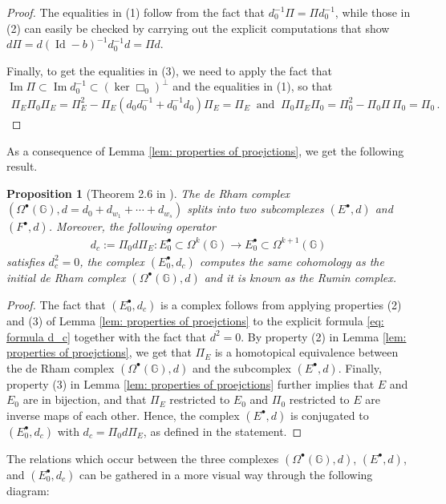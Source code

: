 \documentclass[dvipsnames]{amsart}
\newtheorem{proposition}[theorem]{Proposition}
\theoremstyle{definition}
\theoremstyle{definition}
\numberwithin{equation}{section}
\newcommand{\G}{\mathbb{G}}
\begin{document}
\begin{proof}
    The equalities in (1) follow from the fact that $d_0^{-1}\Pi=\Pi d_0^{-1}$, while those in (2) can easily be checked by carrying out the explicit computations that show $d\Pi=d(\operatorname{Id}-b)^{-1}d_0^{-1}d=\Pi d$.

    Finally, to get the equalities in (3), we need to apply the fact that $\operatorname{Im}\Pi\subset\operatorname{Im}d_0^{-1}\subset\left(\ker\Box_0\right)^\perp$ and the equalities in (1), so that
    \begin{align*}
        \Pi_E\Pi_0\Pi_E=\Pi_E^2-\Pi_E\left(d_0d_0^{-1}+d_0^{-1}d_0\right)\Pi_E=\Pi_E\ \text{ and }\ \Pi_0\Pi_E\Pi_0=\Pi_0^2-\Pi_0\Pi\,\Pi_0=\Pi_0\,.
    \end{align*}
\end{proof}
As a consequence of Lemma \ref{lem: properties of proejctions}, we get the following result.
\begin{proposition}[Theorem 2.6 in \cite{rumin_grenoble}]\label{prop: Rumin computing de RHam} The de Rham complex $(\Omega^\bullet(\G),d=d_0+d_{w_1}+\cdots+d_{w_s})$ splits into two subcomplexes $(E^\bullet,d)$ and $(F^\bullet,d)$. Moreover, the following operator
\begin{align}\label{eq: formula d_c}
    d_c:=\Pi_0d\Pi_E\colon E_0^\bullet\subset\Omega^k(\G)\longrightarrow E_0^\bullet\subset\Omega^{k+1}(\G)
\end{align}
    satisfies $d_c^2=0$, the complex $(E_0^\bullet,d_c)$ computes the same cohomology as the initial de Rham complex $(\Omega^\bullet(\G),d)$ and it is known as the Rumin complex.
\end{proposition}
\begin{proof}
    The fact that $(E_0^\bullet,d_c)$ is a complex follows from applying properties (2) and (3) of Lemma \ref{lem: properties of proejctions} to the explicit formula \eqref{eq: formula d_c} together with the fact that $d^2=0$. By property (2) in Lemma \ref{lem: properties of proejctions}, we get that $\Pi_E$ is a homotopical equivalence between the de Rham complex $(\Omega^\bullet(\G),d)$ and the subcomplex $(E^\bullet,d)$. Finally, property (3) in Lemma \ref{lem: properties of proejctions} further implies that $E$ and $E_0$ are in bijection, and that $\Pi_E$ restricted to $E_0$ and $\Pi_0$ restricted to $E$ are inverse maps of each other. Hence, the complex $(E^\bullet,d)$ is conjugated to $(E_0^\bullet,d_c)$ with $d_c=\Pi_0d\Pi_E$, as defined in the statement.
\end{proof}
The relations which occur between the three complexes $(\Omega^\bullet(\G),d)$, $(E^\bullet,d)$, and $(E_0^\bullet,d_c)$ can be gathered in a more visual way through the following diagram:
\end{document}
